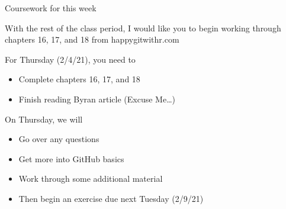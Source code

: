 \documentclass[
  ignorenonframetext,
]{beamer}
\providecommand{\tightlist}{%
  \setlength{\itemsep}{0pt}\setlength{\parskip}{0pt}}
\begin{document}
\begin{frame}{Coursework for this week}
\protect\hypertarget{coursework-for-this-week}{}

With the rest of the class period, I would like you to begin working
through chapters 16, 17, and 18 from happygitwithr.com

For Thursday (2/4/21), you need to

\begin{itemize}
\tightlist
\item
  Complete chapters 16, 17, and 18
\item
  Finish reading Byran article (Excuse Me\ldots{})
\end{itemize}

On Thursday, we will

\begin{itemize}
\tightlist
\item
  Go over any questions
\item
  Get more into GitHub basics
\item
  Work through some additional material
\item
  Then begin an exercise due next Tuesday (2/9/21)
\end{itemize}

\end{frame}
\end{document}
